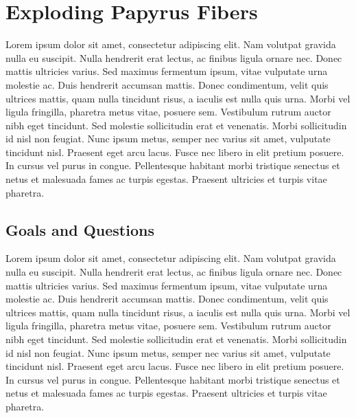 \chapter{Exploding Papyrus Fibers}
Lorem ipsum dolor sit amet, consectetur adipiscing elit. Nam volutpat gravida nulla eu suscipit. Nulla hendrerit erat lectus, ac finibus ligula ornare nec. Donec mattis ultricies varius. Sed maximus fermentum ipsum, vitae vulputate urna molestie ac. Duis hendrerit accumsan mattis. Donec condimentum, velit quis ultrices mattis, quam nulla tincidunt risus, a iaculis est nulla quis urna. Morbi vel ligula fringilla, pharetra metus vitae, posuere sem. Vestibulum rutrum auctor nibh eget tincidunt. Sed molestie sollicitudin erat et venenatis. Morbi sollicitudin id nisl non feugiat. Nunc ipsum metus, semper nec varius sit amet, vulputate tincidunt nisl. Praesent eget arcu lacus. Fusce nec libero in elit pretium posuere. In cursus vel purus in congue. Pellentesque habitant morbi tristique senectus et netus et malesuada fames ac turpis egestas. Praesent ultricies et turpis vitae pharetra.

\section{Goals and Questions}
Lorem ipsum dolor sit amet, consectetur adipiscing elit. Nam volutpat gravida nulla eu suscipit. Nulla hendrerit erat lectus, ac finibus ligula ornare nec. Donec mattis ultricies varius. Sed maximus fermentum ipsum, vitae vulputate urna molestie ac. Duis hendrerit accumsan mattis. Donec condimentum, velit quis ultrices mattis, quam nulla tincidunt risus, a iaculis est nulla quis urna. Morbi vel ligula fringilla, pharetra metus vitae, posuere sem. Vestibulum rutrum auctor nibh eget tincidunt. Sed molestie sollicitudin erat et venenatis. Morbi sollicitudin id nisl non feugiat. Nunc ipsum metus, semper nec varius sit amet, vulputate tincidunt nisl. Praesent eget arcu lacus. Fusce nec libero in elit pretium posuere. In cursus vel purus in congue. Pellentesque habitant morbi tristique senectus et netus et malesuada fames ac turpis egestas. Praesent ultricies et turpis vitae pharetra.

